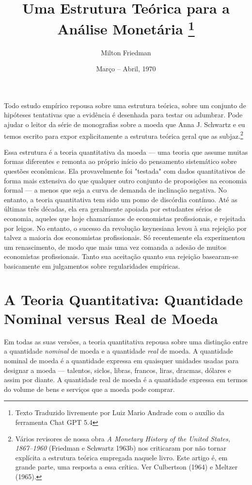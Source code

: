 \documentclass[12pt]{article}
\title{Uma Estrutura Teórica para a Análise Monetária \thanks{Texto Traduzido livremente por Luiz Mario Andrade com o auxílio da ferramenta Chat GPT 5.4}}
\author{Milton Friedman}
\date{Março – Abril, 1970}
\begin{document}
\maketitle

Todo estudo empírico repousa sobre uma estrutura teórica, sobre um conjunto de hipóteses tentativas que a evidência é desenhada para testar ou adumbrar. Pode ajudar o leitor da série de monografias sobre a moeda que Anna J. Schwartz e eu temos escrito para expor explicitamente a estrutura teórica geral que as subjaz.\footnote{Vários revisores de nossa obra \textit{A Monetary History of the United States, 1867–1960} (Friedman e Schwartz 1963b) nos criticaram por não tornar explícita a estrutura teórica empregada naquele livro. Este artigo é, em grande parte, uma resposta a essa crítica. Ver Culbertson (1964) e Meltzer (1965).}

Essa estrutura é a teoria quantitativa da moeda — uma teoria que assume muitas formas diferentes e remonta ao próprio início do pensamento sistemático sobre questões econômicas. Ela provavelmente foi "testada" com dados quantitativos de forma mais extensiva do que qualquer outro conjunto de proposições na economia formal — a menos que seja a curva de demanda de inclinação negativa. No entanto, a teoria quantitativa tem sido um pomo de discórdia contínuo. Até as últimas três décadas, ela era geralmente apoiada por estudantes sérios de economia, aqueles que hoje chamaríamos de economistas profissionais, e rejeitada por leigos. No entanto, o sucesso da revolução keynesiana levou à sua rejeição por talvez a maioria dos economistas profissionais. Só recentemente ela experimentou um renascimento, de modo que mais uma vez comanda a adesão de muitos economistas profissionais. Tanto sua aceitação quanto sua rejeição basearam-se basicamente em julgamentos sobre regularidades empíricas.

\section{A Teoria Quantitativa: Quantidade Nominal versus Real de Moeda}

Em todas as suas versões, a teoria quantitativa repousa sobre uma distinção entre a quantidade \textit{nominal} de moeda e a quantidade \textit{real} de moeda. A quantidade nominal de moeda é a quantidade expressa em quaisquer unidades usadas para designar a moeda — talentos, siclos, libras, francos, liras, dracmas, dólares e assim por diante. A quantidade real de moeda é a quantidade expressa em termos do volume de bens e serviços que a moeda pode comprar.
\end{document}
